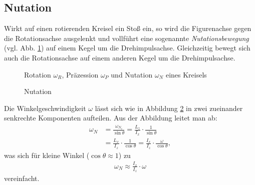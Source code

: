\subsection{Nutation}
Wirkt auf einen rotierenden Kreisel ein Stoß ein, so wird die Figurenachse gegen die Rotationsachse ausgelenkt und vollführt eine sogenannte \textit{Nutationsbewegung} (vgl. Abb. \ref{img:2}) auf einem Kegel um die Drehimpulsachse. Gleichzeitig bewegt sich auch die Rotationsachse auf einem anderen Kegel um die Drehimpulsachse.
\begin{figure}[!htbp]
\centering
\resizebox{0.5\textwidth}{!}{}
\caption{Rotation $\omega_R$, Präzession $\omega_P$ und Nutation $\omega_N$ eines Kreisels}
\label{img:2}
\end{figure}
%
\begin{figure}[!htbp]
\centering
\resizebox{\textwidth}{!}{}
\caption{Nutation}
\label{img:6}
\end{figure}
%
Die Winkelgeschwindigkeit $\omega$ lässt sich wie in Abbildung \ref{img:6} in zwei zueinander senkrechte Komponenten aufteilen. Aus der Abbildung leitet man ab:
\begin{align}
	\omega_N&=\frac{\omega_{N_z}}{\sin\theta}=\frac{L_z}{I_x}\cdot\frac{1}{\sin\theta}\nonumber\\
	&=\frac{L_x}{I_z}\cdot\frac{1}{\cos\theta}=\frac{I_x}{I_z}\cdot\frac{\omega}{\cos\theta},
\end{align}
was sich für kleine Winkel ($\cos\theta\approx1$) zu
\begin{align}
	\omega_N\approx\frac{I_x}{I_z}\cdot\omega
	\label{eq:7}
\end{align}
vereinfacht.